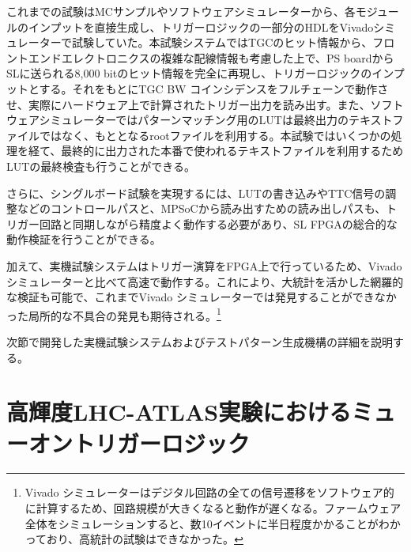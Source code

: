 これまでの試験はMCサンプルやソフトウェアシミュレーターから、各モジュールのインプットを直接生成し、トリガーロジックの一部分のHDLをVivadoシミュレーターで試験していた。本試験システムではTGCのヒット情報から、フロントエンドエレクトロニクスの複雑な配線情報も考慮した上で、PS boardからSLに送られる8,000 bitのヒット情報を完全に再現し、トリガーロジックのインプットとする。それをもとにTGC BW コインシデンスをフルチェーンで動作させ、実際にハードウェア上で計算されたトリガー出力を読み出す。また、ソフトウェアシミュレーターではパターンマッチング用のLUTは最終出力のテキストファイルではなく、もととなるrootファイルを利用する。本試験ではいくつかの処理を経て、最終的に出力された本番で使われるテキストファイルを利用するためLUTの最終検査も行うことができる。

さらに、シングルボード試験を実現するには、LUTの書き込みやTTC信号の調整などのコントロールパスと、MPSoCから読み出すための読み出しパスも、トリガー回路と同期しながら精度よく動作する必要があり、SL FPGAの総合的な動作検証を行うことができる。

加えて、実機試験システムはトリガー演算をFPGA上で行っているため、Vivado シミュレーターと比べて高速で動作する。これにより、大統計を活かした網羅的な検証も可能で、これまでVivado シミュレーターでは発見することができなかった局所的な不具合の発見も期待される。\footnote{Vivado シミュレーターはデジタル回路の全ての信号遷移をソフトウェア的に計算するため、回路規模が大きくなると動作が遅くなる。ファームウェア全体をシミュレーションすると、数10イベントに半日程度かかることがわかっており、高統計の試験はできなかった。}

次節で開発した実機試験システムおよびテストパターン生成機構の詳細を説明する。


\section{高輝度LHC-ATLAS実験におけるミューオントリガーロジック}
\label{sec_Phase2TriggerLogic}

